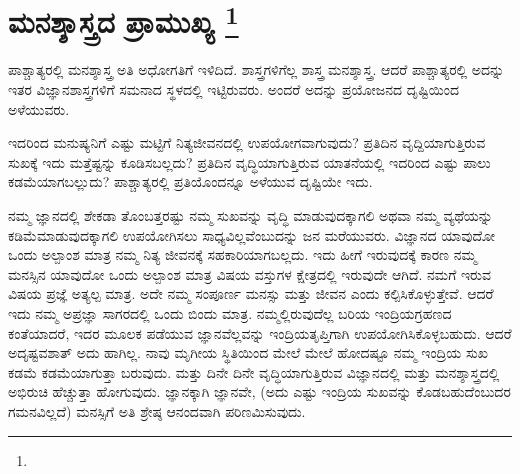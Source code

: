 
\chapter{ಮನಶ್ಶಾಸ್ತ್ರದ ಪ್ರಾಮುಖ್ಯ \protect\footnote{}}

ಪಾಶ್ಚಾತ್ಯರಲ್ಲಿ ಮನಶ್ಶಾಸ್ತ್ರ ಅತಿ ಅಧೋಗತಿಗೆ ಇಳಿದಿದೆ. ಶಾಸ್ತ್ರಗಳಿಗೆಲ್ಲ ಶಾಸ್ತ್ರ ಮನಶ್ಶಾಸ್ತ್ರ. ಆದರೆ ಪಾಶ್ಚಾತ್ಯರಲ್ಲಿ ಅದನ್ನು ಇತರ ವಿಜ್ಞಾನಶಾಸ್ತ್ರಗಳಿಗೆ ಸಮನಾದ ಸ್ಥಳದಲ್ಲಿ ಇಟ್ಟಿರುವರು. ಅಂದರೆ ಅದನ್ನು ಪ್ರಯೋಜನದ ದೃಷ್ಟಿಯಿಂದ ಅಳೆಯುವರು.

ಇದರಿಂದ ಮನುಷ್ಯನಿಗೆ ಎಷ್ಟು ಮಟ್ಟಿಗೆ ನಿತ್ಯಜೀವನದಲ್ಲಿ ಉಪಯೋಗವಾಗುವುದು? ಪ್ರತಿದಿನ ವೃದ್ದಿಯಾಗುತ್ತಿರುವ ಸುಖಕ್ಕೆ ಇದು ಮತ್ತೆಷ್ಟನ್ನು ಕೂಡಿಸಬಲ್ಲದು? ಪ್ರತಿದಿನ ವೃದ್ಧಿಯಾಗುತ್ತಿರುವ ಯಾತನೆಯಲ್ಲಿ ಇದರಿಂದ ಎಷ್ಟು ಪಾಲು ಕಡಮೆಯಾಗಬಲ್ಲುದು? ಪಾಶ್ಚಾತ್ಯರಲ್ಲಿ ಪ್ರತಿಯೊಂದನ್ನೂ ಅಳೆಯುವ ದೃಷ್ಟಿಯೇ ಇದು.

ನಮ್ಮ ಜ್ಞಾನದಲ್ಲಿ ಶೇಕಡಾ ತೊಂಬತ್ತರಷ್ಟು ನಮ್ಮ ಸುಖವನ್ನು ವೃದ್ಧಿ ಮಾಡುವುದಕ್ಕಾಗಲಿ ಅಥವಾ ನಮ್ಮ ವ್ಯಥೆಯನ್ನು ಕಡಿಮೆಮಾಡುವುದಕ್ಕಾಗಲಿ ಉಪಯೋಗಿಸಲು ಸಾಧ್ಯವಿಲ್ಲವೆಂಬುದನ್ನು ಜನ ಮರೆಯುವರು. ವಿಜ್ಞಾನದ ಯಾವುದೋ ಒಂದು ಅಲ್ಪಾಂಶ ಮಾತ್ರ ನಮ್ಮ ನಿತ್ಯ ಜೀವನಕ್ಕೆ ಸಹಕಾರಿಯಾಗಬಲ್ಲದು. ಇದು ಹೀಗೆ ಇರುವುದಕ್ಕೆ ಕಾರಣ ನಮ್ಮ ಮನಸ್ಸಿನ ಯಾವುದೋ ಒಂದು ಅಲ್ಪಾಂಶ ಮಾತ್ರ ವಿಷಯ ವಸ್ತುಗಳ ಕ್ಷೇತ್ರದಲ್ಲಿ ಇರುವುದೇ ಆಗಿದೆ. ನಮಗೆ ಇರುವ ವಿಷಯ ಪ್ರಜ್ಞೆ ಅತ್ಯಲ್ಪ ಮಾತ್ರ. ಅದೇ ನಮ್ಮ ಸಂಪೂರ್ಣ ಮನಸ್ಸು ಮತ್ತು ಜೀವನ ಎಂದು ಕಲ್ಪಿಸಿಕೊಳ್ಳುತ್ತೇವೆ. ಆದರೆ ಇದು ನಮ್ಮ ಅಪ್ರಜ್ಞಾ ಸಾಗರದಲ್ಲಿ ಒಂದು ಬಿಂದು ಮಾತ್ರ. ನಮ್ಮಲ್ಲಿರುವುದೆಲ್ಲ ಬರಿಯ ಇಂದ್ರಿಯಗ್ರಹಣದ ಕಂತೆಯಾದರೆ, ಇದರ ಮೂಲಕ ಪಡೆಯುವ ಜ್ಞಾನವೆಲ್ಲವನ್ನು ಇಂದ್ರಿಯತೃಪ್ತಿಗಾಗಿ ಉಪಯೋಗಿಸಿಕೊಳ್ಳಬಹುದು. ಆದರೆ ಅದೃಷ್ಟವಶಾತ್ ಅದು ಹಾಗಿಲ್ಲ. ನಾವು ಮೃಗೀಯ ಸ್ಥಿತಿಯಿಂದ ಮೇಲೆ ಮೇಲೆ ಹೋದಷ್ಟೂ ನಮ್ಮ ಇಂದ್ರಿಯ ಸುಖ ಕಡಮೆ ಕಡಮೆಯಾಗುತ್ತಾ ಬರುವುದು. ಮತ್ತು ದಿನೇ ದಿನೇ ವೃದ್ಧಿಯಾಗುತ್ತಿರುವ ವಿಜ್ಞಾನದಲ್ಲಿ ಮತ್ತು ಮನಶ್ಶಾಸ್ತ್ರದಲ್ಲಿ ಅಭಿರುಚಿ ಹೆಚ್ಚುತ್ತಾ ಹೋಗುವುದು. ಜ್ಞಾನಕ್ಕಾಗಿ ಜ್ಞಾನವೇ, (ಅದು ಎಷ್ಟು ಇಂದ್ರಿಯ ಸುಖವನ್ನು ಕೊಡಬಹುದೆಂಬುದರ ಗಮನವಿಲ್ಲದೆ) ಮನಸ್ಸಿಗೆ ಅತಿ ಶ್ರೇಷ್ಠ ಆನಂದವಾಗಿ ಪರಿಣಮಿಸುವುದು.

